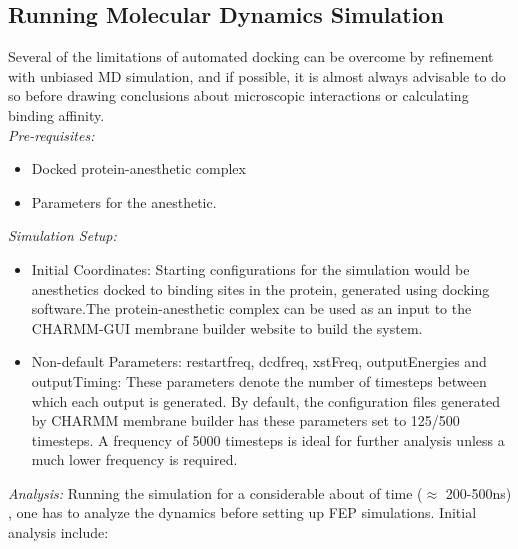 \documentclass[12pt]{article}
\begin{document}
\subsection{Running Molecular Dynamics Simulation}
\label{sec:unbiasedMD}
Several of the limitations of automated docking can be overcome by refinement with unbiased MD simulation, and if possible, it is almost always advisable to do so before drawing conclusions about microscopic interactions or calculating binding affinity.\hfill \break
\\

\textit{Pre-requisites:} 
\begin{itemize}
 \item Docked protein-anesthetic complex
 \item Parameters for the anesthetic.
\end{itemize}
\textit{Simulation Setup:}
\begin{itemize}
 \item Initial Coordinates: Starting configurations for the simulation would be anesthetics docked to binding sites in the protein, generated using docking software.The protein-anesthetic complex can be used as an input to the  CHARMM-GUI membrane builder website\cite{Jo2009} to build the system.

\item Non-default Parameters: 
	restartfreq, dcdfreq, xstFreq, outputEnergies and outputTiming: These parameters denote the number of timesteps between which each output is generated. By default, the configuration files generated by CHARMM membrane builder has these parameters set to 125/500 timesteps. A frequency of 5000 timesteps is ideal for further analysis unless a much lower frequency is required.
 \end{itemize}
\textit{Analysis:}
Running the simulation for a considerable about of time ($\approx$ 200-500ns) , one has to analyze the dynamics before setting up FEP simulations. Initial analysis include:  
\end{document}
